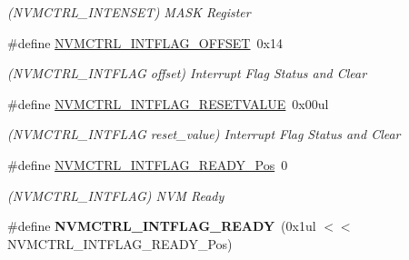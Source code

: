 \begin{DoxyCompactItemize}
\begin{DoxyCompactList}\small\item\em (N\+V\+M\+C\+T\+R\+L\+\_\+\+I\+N\+T\+E\+N\+S\+E\+T) M\+A\+S\+K Register \end{DoxyCompactList}\item 
\hypertarget{group___s_a_m_l21___n_v_m_c_t_r_l_ga28bff79f1cf058fa8a6c7072f5913862}{}\#define \hyperlink{group___s_a_m_l21___n_v_m_c_t_r_l_ga28bff79f1cf058fa8a6c7072f5913862}{N\+V\+M\+C\+T\+R\+L\+\_\+\+I\+N\+T\+F\+L\+A\+G\+\_\+\+O\+F\+F\+S\+E\+T}~0x14\label{group___s_a_m_l21___n_v_m_c_t_r_l_ga28bff79f1cf058fa8a6c7072f5913862}

\begin{DoxyCompactList}\small\item\em (N\+V\+M\+C\+T\+R\+L\+\_\+\+I\+N\+T\+F\+L\+A\+G offset) Interrupt Flag Status and Clear \end{DoxyCompactList}\item 
\hypertarget{group___s_a_m_l21___n_v_m_c_t_r_l_ga2d7e54384a5f6445cc9b9769ddf32ac2}{}\#define \hyperlink{group___s_a_m_l21___n_v_m_c_t_r_l_ga2d7e54384a5f6445cc9b9769ddf32ac2}{N\+V\+M\+C\+T\+R\+L\+\_\+\+I\+N\+T\+F\+L\+A\+G\+\_\+\+R\+E\+S\+E\+T\+V\+A\+L\+U\+E}~0x00ul\label{group___s_a_m_l21___n_v_m_c_t_r_l_ga2d7e54384a5f6445cc9b9769ddf32ac2}

\begin{DoxyCompactList}\small\item\em (N\+V\+M\+C\+T\+R\+L\+\_\+\+I\+N\+T\+F\+L\+A\+G reset\+\_\+value) Interrupt Flag Status and Clear \end{DoxyCompactList}\item 
\hypertarget{group___s_a_m_l21___n_v_m_c_t_r_l_gab04b4aece1f516c2e7ee00e7f29c9b69}{}\#define \hyperlink{group___s_a_m_l21___n_v_m_c_t_r_l_gab04b4aece1f516c2e7ee00e7f29c9b69}{N\+V\+M\+C\+T\+R\+L\+\_\+\+I\+N\+T\+F\+L\+A\+G\+\_\+\+R\+E\+A\+D\+Y\+\_\+\+Pos}~0\label{group___s_a_m_l21___n_v_m_c_t_r_l_gab04b4aece1f516c2e7ee00e7f29c9b69}

\begin{DoxyCompactList}\small\item\em (N\+V\+M\+C\+T\+R\+L\+\_\+\+I\+N\+T\+F\+L\+A\+G) N\+V\+M Ready \end{DoxyCompactList}\item 
\hypertarget{group___s_a_m_l21___n_v_m_c_t_r_l_ga3c427a204dab120e2aee8839fbe1cc7c}{}\#define {\bfseries N\+V\+M\+C\+T\+R\+L\+\_\+\+I\+N\+T\+F\+L\+A\+G\+\_\+\+R\+E\+A\+D\+Y}~(0x1ul $<$$<$ N\+V\+M\+C\+T\+R\+L\+\_\+\+I\+N\+T\+F\+L\+A\+G\+\_\+\+R\+E\+A\+D\+Y\+\_\+\+Pos)\label{group___s_a_m_l21___n_v_m_c_t_r_l_ga3c427a204dab120e2aee8839fbe1cc7c}


\end{DoxyCompactItemize}
